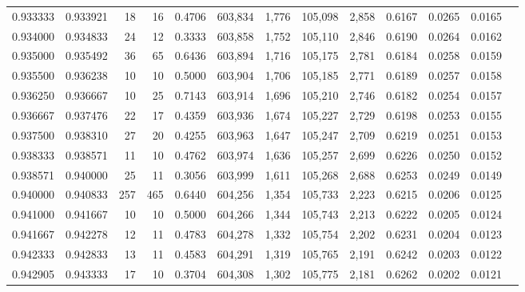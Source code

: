 \begin{tabular}{rrrrrrrrrrrrr}
0.933333 & 0.933921 &    18 &  16 &                                     0.4706 & 603,834 &   1,776 & 105,098 &   2,858 & 0.6167 & 0.0265 & 0.0165 \\
0.934000 & 0.934833 &    24 &  12 &                                     0.3333 & 603,858 &   1,752 & 105,110 &   2,846 & 0.6190 & 0.0264 & 0.0162 \\
0.935000 & 0.935492 &    36 &  65 &                                     0.6436 & 603,894 &   1,716 & 105,175 &   2,781 & 0.6184 & 0.0258 & 0.0159 \\
0.935500 & 0.936238 &    10 &  10 &                                     0.5000 & 603,904 &   1,706 & 105,185 &   2,771 & 0.6189 & 0.0257 & 0.0158 \\
0.936250 & 0.936667 &    10 &  25 &                                     0.7143 & 603,914 &   1,696 & 105,210 &   2,746 & 0.6182 & 0.0254 & 0.0157 \\
0.936667 & 0.937476 &    22 &  17 &                                     0.4359 & 603,936 &   1,674 & 105,227 &   2,729 & 0.6198 & 0.0253 & 0.0155 \\
0.937500 & 0.938310 &    27 &  20 &                                     0.4255 & 603,963 &   1,647 & 105,247 &   2,709 & 0.6219 & 0.0251 & 0.0153 \\
0.938333 & 0.938571 &    11 &  10 &                                     0.4762 & 603,974 &   1,636 & 105,257 &   2,699 & 0.6226 & 0.0250 & 0.0152 \\
0.938571 & 0.940000 &    25 &  11 &                                     0.3056 & 603,999 &   1,611 & 105,268 &   2,688 & 0.6253 & 0.0249 & 0.0149 \\
0.940000 & 0.940833 &   257 & 465 &                                     0.6440 & 604,256 &   1,354 & 105,733 &   2,223 & 0.6215 & 0.0206 & 0.0125 \\
0.941000 & 0.941667 &    10 &  10 &                                     0.5000 & 604,266 &   1,344 & 105,743 &   2,213 & 0.6222 & 0.0205 & 0.0124 \\
0.941667 & 0.942278 &    12 &  11 &                                     0.4783 & 604,278 &   1,332 & 105,754 &   2,202 & 0.6231 & 0.0204 & 0.0123 \\
0.942333 & 0.942833 &    13 &  11 &                                     0.4583 & 604,291 &   1,319 & 105,765 &   2,191 & 0.6242 & 0.0203 & 0.0122 \\
0.942905 & 0.943333 &    17 &  10 &                                     0.3704 & 604,308 &   1,302 & 105,775 &   2,181 & 0.6262 & 0.0202 & 0.0121 \\

\end{tabular}
